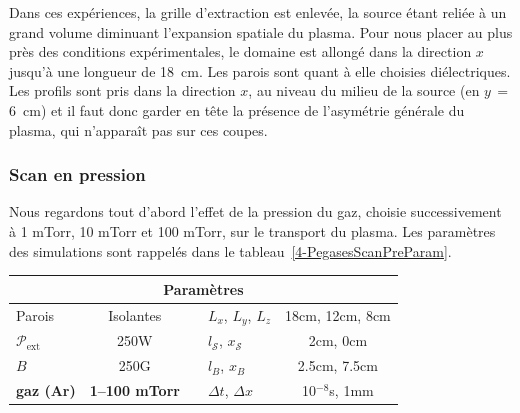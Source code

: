 \begin{refsection}
Dans ces expériences, la
grille d'extraction est enlevée, la source étant reliée à un grand volume
diminuant l'expansion spatiale du plasma. Pour nous placer au plus près des
conditions expérimentales, le domaine est allongé dans
la direction $x$ jusqu'à une longueur de 18~cm. Les parois sont quant à elle
choisies diélectriques. Les profils sont pris dans la direction $x$, au niveau
du milieu de la source (en $y\,=$ 6~cm) et il faut donc garder en tête la
présence de l'asymétrie générale du plasma, qui n'apparaît pas sur ces coupes.
	
\subsubsection{Scan en pression}
Nous regardons tout d'abord l'effet de la pression du gaz, choisie
successivement à 1 mTorr, 10 mTorr et 100 mTorr, sur le transport du plasma.
Les paramètres des simulations sont rappelés dans le
	tableau~\ref{4-PegasesScanPreParam}. 

\begin{minipage}{\textwidth}
\footnotesize\centering
{}
\begin{tabular}{lcclc}\toprule
\multicolumn{5}{c}{\bf Paramètres}\\
\midrule 
Parois & Isolantes &&$L_x$, $L_y$, $L_z$  & 18cm, 12cm,
8cm\\
$\mathcal{P}_\text{ext}$&250W&&$l_\mathcal{S}$, $x_\mathcal{S}$&2cm, 0cm\\
$B$&250G&&$l_B$, $x_B$&2.5cm, 7.5cm\\
\textbf{gaz (Ar)} & \textbf{1--100 mTorr}&&$\Delta t$, $\Delta x$&10$^{-8}$s,
1mm\\
\bottomrule
\end{tabular}
\label{4-PegasesScanPreParam}
\end{minipage}	
	

\end{refsection}
